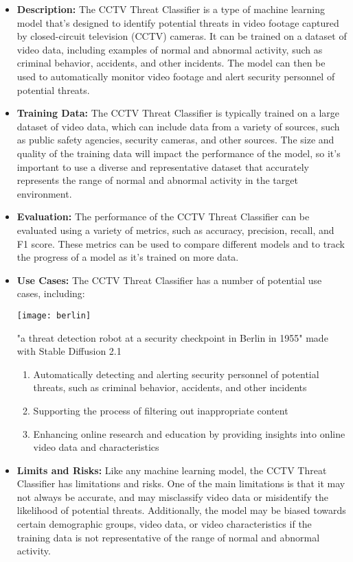\begin{itemize}
\begin{itemize}
    \item \textbf{Description:} The CCTV Threat Classifier is a type of machine learning model that's designed to identify potential threats in video footage captured by closed-circuit television (CCTV) cameras. It can be trained on a dataset of video data, including examples of normal and abnormal activity, such as criminal behavior, accidents, and other incidents. The model can then be used to automatically monitor video footage and alert security personnel of potential threats.
    \item \textbf{Training Data:} The CCTV Threat Classifier is typically trained on a large dataset of video data, which can include data from a variety of sources, such as public safety agencies, security cameras, and other sources. The size and quality of the training data will impact the performance of the model, so it's important to use a diverse and representative dataset that accurately represents the range of normal and abnormal activity in the target environment.
    \item \textbf{Evaluation:} The performance of the CCTV Threat Classifier can be evaluated using a variety of metrics, such as accuracy, precision, recall, and F1 score. These metrics can be used to compare different models and to track the progress of a model as it's trained on more data.
    \item \textbf{Use Cases:} The CCTV Threat Classifier has a number of potential use cases, including:
\begin{marginfigure}[-5.5cm]
        \texttt{[image: berlin]}
        \caption{"a threat detection robot at a security checkpoint in Berlin in 1955" made with Stable Diffusion 2.1}
\end{marginfigure}
        \begin{enumerate}  
            \item Automatically detecting and alerting security personnel of potential threats, such as criminal behavior, accidents, and other incidents
            \item Supporting the process of filtering out inappropriate content
            \item Enhancing online research and education by providing insights into online video data and characteristics
        \end{enumerate}
    \item \textbf{Limits and Risks:} Like any machine learning model, the CCTV Threat Classifier has limitations and risks. One of the main limitations is that it may not always be accurate, and may misclassify video data or misidentify the likelihood of potential threats. Additionally, the model may be biased towards certain demographic groups, video data, or video characteristics if the training data is not representative of the range of normal and abnormal activity.

\end{itemize}
\end{itemize}
